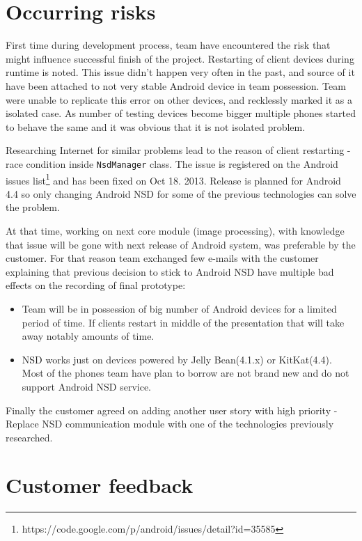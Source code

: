\section{Occurring risks}
\label{sec:sprint5_occuring_risks}
First time during development process, team have encountered the risk that might influence successful finish of the project. 
Restarting of client devices during runtime is noted. This issue didn't happen very often in the past, and source of it have been attached to not very stable Android device in team possession. Team were unable to replicate this error on other devices, and recklessly marked it as a isolated case. As number of testing devices become bigger multiple phones started to behave the same and it was obvious that it is not isolated problem. 

Researching Internet for similar problems lead to the
reason of client restarting - race condition inside \texttt{NsdManager} class. The issue is registered on the Android issues list\footnote{https://code.google.com/p/android/issues/detail?id=35585} and has been fixed on Oct 18. 2013. Release is planned for Android 4.4 so only changing Android NSD for some of the previous technologies can solve the problem. 

At that time, working on next core module (image processing), with knowledge that issue will be gone with next release of Android system, was preferable by the customer. For that reason team exchanged few e-mails with the customer explaining that previous decision to stick to Android NSD have multiple bad effects on the recording of final prototype:
\begin{itemize}
\item Team will be in possession of big number of Android devices for a limited period of time. If clients restart in middle of the presentation that will take away notably amounts of time.

\item NSD works just on devices powered by Jelly Bean(4.1.x) or KitKat(4.4). Most of the phones team have plan to borrow are not brand new and do not support Android NSD service.
\end{itemize}

Finally the customer agreed on adding another user story with high priority - Replace NSD communication module with one of the technologies previously researched.

\section{Customer feedback}
